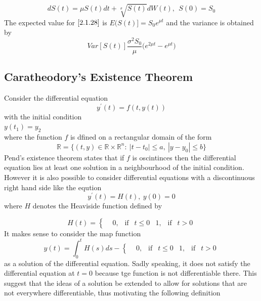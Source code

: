 \documentclass[a4 paper, 12pt]{report}
\theoremstyle{plain}
\begin{document}
\begin{equation}\label{2.1.28}
dS(t) = \mu S(t)dt+\sqrt[\sigma]{S(t)}dW(t),~~S(0) = S_0
\end{equation}
The expected value for $\eqref{2.1.28}$ is $E(S(t)] = S_0 e^{\mu t}$ and the variance is obtained by
$$
Var[S(t)]\frac{\sigma^2S_0}{\mu}\bigg(e^{2\mu t} - e^{\mu t}\bigg)
$$
\subsection{Caratheodory's Existence Theorem}
Consider the differential equation
$$
y^\prime(t) = f(t,y(t))
$$
with the initial condition\\
$y(t_1) = y_2$\\
where the function $f$ is dfined on a rectangular domain of the form
$$
\mathbb{R} = \{(t,y)\in\mathbb{R}\times\mathbb{R}^n:~|t-t_0|\leq a,~|y-y_0|\leq b\}
$$
Pend's existence theorem states that if  $f$ is oscintinces then the differential equation lies at least one  solution in a neighbourhood of the initial condition.\\
However  it  is also possible to consider differential equations with a discontinuous right hand side like the eqution
$$
y^\prime(t) = H(t),~y(0) = 0
$$
where $H$ denotes the Heaviside function defined by


\begin{equation*}%
H(t) = \left\{
\begin{split}
&0,~~\mbox{  if  }~~t\leq 0 
&1,~~\mbox{  if  }~~t> 0 
\end{split}
\right.
\end{equation*}
It makes sense to consider the map function
\begin{equation*}%
y(t) = \int_0^t H(s)ds-
\left\{
\begin{split}
&0,~~\mbox{  if  }~~t\leq 0 
&1,~~\mbox{  if  }~~t> 0 
\end{split}
\right.
\end{equation*}
as a solution of the differential equation. Sadly speaking, it does not satisfy the differential equation at $t = 0$ because tge function is not differentiable there. This suggest that the ideas of a solution be extended to allow for solutions that are not everywhere differentiable, thus motivating the following definition\\
\end{document}
